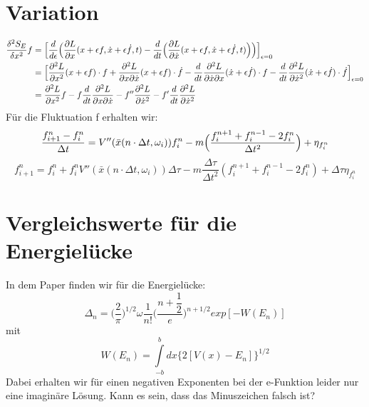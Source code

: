 \documentclass[a4paper,parskip=half,10pt]{scrartcl}
\begin{document}
\section{Variation}
\begin{align}
\dfrac{\delta^{2}S_{E}}{\delta x^{2}} f &= \Bigl\lbrack \dfrac{d}{d\epsilon}\Bigl(\dfrac{\partial L}{\partial x}(x+\epsilon f,\dot{x}+\epsilon \dot{f},t)-\dfrac{d}{dt}\Bigl(\dfrac{\partial L}{\partial \dot{x}}(x+\epsilon f, \dot{x}+\epsilon \dot{f},t)\Bigr)\Bigr)\Bigr\rbrack_{\epsilon=0} \\
&=\Bigl\lbrack \dfrac{\partial^2 L}{\partial x^2}(x+\epsilon f)\cdot f + \dfrac{\partial^2 L}{\partial x \partial \dot{x}}(x+\epsilon f) \cdot \dot{f} - \dfrac{d}{dt}\dfrac{\partial^2 L}{\partial \dot{x}\partial x}(\dot{x}+\epsilon \dot{f})\cdot f-\dfrac{d}{dt}\dfrac{\partial^2 L}{\partial \dot{x}^2}(\dot{x}+\epsilon \dot{f})\cdot \dot{f}\Bigr\rbrack_{\epsilon=0}\\
&=\dfrac{\partial^2 L}{\partial x^2}f-f\dfrac{d}{dt}\dfrac{\partial^2 L}{\partial x \partial \dot{x}}-f''\dfrac{\partial^2 L}{\partial \dot{x}^2}-f'\dfrac{d}{dt}\dfrac{\partial^2 L}{\partial \dot{x}^2}
\end{align}
Für die Fluktuation f erhalten wir:
\begin{equation}
\dfrac{f_{i+1}^{n}-f_{i}^{n}}{\Delta t}=V''(\bar{x}(n\cdot \Delta t,\omega_{i}))f_{i}^{n}-m\Bigl(\dfrac{f_{i}^{n+1}+f_{i}^{n-1}-2f_{i}^{n}}{\Delta t^2}\Bigr)+\eta_{f_{i}^{n}}
\end{equation}
\begin{equation}
f_{i+1}^{n}= f_{i}^{n}+f_{i}^{n}V''(\bar{x}(n\cdot \Delta t, \omega_{i}))\Delta \tau-m\dfrac{\Delta\tau}{\Delta t^2}(f_{i}^{n+1}+f_{i}^{n-1}-2f_{i}^{n})+\Delta\tau\eta_{f_{i}^{n}}
\end{equation}



\section{Vergleichswerte für die Energielücke}
In dem Paper \cite{KISELEV1992454} finden wir für die Energielücke:
\begin{equation}
\Delta_{n}=\biggl(\dfrac{2}{\pi}\biggr)^{1/2}\omega \dfrac{1}{n!}\biggl(\dfrac{n+\dfrac{1}{2}}{e}\biggr)^{n+1/2}exp[-W(E_{n})]
\end{equation}
mit
\begin{equation}
 W(E_{n})=\int \limits_{-b}^{b} dx\lbrace 2[V(x)-E_{n}]\rbrace^{1/2}
 \end{equation} 
Dabei erhalten wir für einen negativen Exponenten bei der e-Funktion leider nur eine imaginäre Lösung. Kann es sein, dass das Minuszeichen falsch ist?
\pagebreak
\printbibliography[title={Literaturverzeichnis}]
\end{document}
